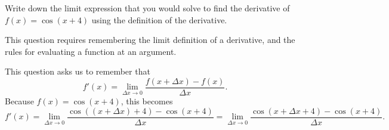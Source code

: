 \documentclass{ximera}
\author{Emma Smith Zbarsky}
\begin{document}
\begin{exercise}

Write down the limit expression that you would solve to find the
derivative of $f(x) = \cos(x+4)$ using the definition of the derivative.


\begin{hint}
This question requires remembering the limit definition of a derivative,
and the rules for evaluating a function at an argument.
\end{hint}


\begin{hint}
This question asks us to remember that
\[f'(x) = \lim_{\Delta x \to 0} \frac{f(x+\Delta x)-f(x)}{\Delta x}.\]
Because $f(x) = \cos(x+4)$, this becomes
\[f'(x) = \lim_{\Delta x \to 0} \frac{\cos((x+\Delta x)+4)-\cos(x+4)}{\Delta x} = \lim_{\Delta x \to 0} \frac{\cos(x+\Delta x+4)-\cos(x+4)}{\Delta x}.\]
\end{hint}


\begin{multipleChoice}
\end{multipleChoice}

\end{exercise}
\end{document}

